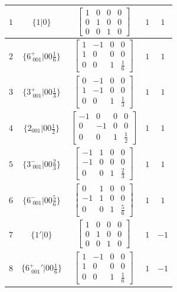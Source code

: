 \documentclass[fleqn,8pt]{jsarticle}
\begin{document}
\begin{longtable}{ccccc}
$ 1 $ & $ \{1|0\} $ & $ \begin{bmatrix} 1 & 0 & 0 & 0 \\ 0 & 1 & 0 & 0 \\ 0 & 0 & 1 & 0 \end{bmatrix} $ & $ 1 $ & $ 1 $ \\ \hline
$ 2 $ & $ \{6^{+}_{\,\,001}|0 0 \frac{1}{6}\} $ & $ \begin{bmatrix} 1 & -1 & 0 & 0 \\ 1 & 0 & 0 & 0 \\ 0 & 0 & 1 & \frac{1}{6} \end{bmatrix} $ & $ 1 $ & $ 1 $ \\ \hline
$ 3 $ & $ \{3^{+}_{\,\,001}|0 0 \frac{1}{3}\} $ & $ \begin{bmatrix} 0 & -1 & 0 & 0 \\ 1 & -1 & 0 & 0 \\ 0 & 0 & 1 & \frac{1}{3} \end{bmatrix} $ & $ 1 $ & $ 1 $ \\ \hline
$ 4 $ & $ \{2{}_{001}|0 0 \frac{1}{2}\} $ & $ \begin{bmatrix} -1 & 0 & 0 & 0 \\ 0 & -1 & 0 & 0 \\ 0 & 0 & 1 & \frac{1}{2} \end{bmatrix} $ & $ 1 $ & $ 1 $ \\ \hline
$ 5 $ & $ \{3^{-}_{\,\,001}|0 0 \frac{2}{3}\} $ & $ \begin{bmatrix} -1 & 1 & 0 & 0 \\ -1 & 0 & 0 & 0 \\ 0 & 0 & 1 & \frac{2}{3} \end{bmatrix} $ & $ 1 $ & $ 1 $ \\ \hline
$ 6 $ & $ \{6^{-}_{\,\,001}|0 0 \frac{5}{6}\} $ & $ \begin{bmatrix} 0 & 1 & 0 & 0 \\ -1 & 1 & 0 & 0 \\ 0 & 0 & 1 & \frac{5}{6} \end{bmatrix} $ & $ 1 $ & $ 1 $ \\ \hline
$ 7 $ & $ \{1{}'|0\} $ & $ \begin{bmatrix} 1 & 0 & 0 & 0 \\ 0 & 1 & 0 & 0 \\ 0 & 0 & 1 & 0 \end{bmatrix} $ & $ 1 $ & $ -1 $ \\ \hline
$ 8 $ & $ \{6^{+}_{\,\,001}{}'|0 0 \frac{1}{6}\} $ & $ \begin{bmatrix} 1 & -1 & 0 & 0 \\ 1 & 0 & 0 & 0 \\ 0 & 0 & 1 & \frac{1}{6} \end{bmatrix} $ & $ 1 $ & $ -1 $ \\ \hline

\end{longtable}
\end{document}
